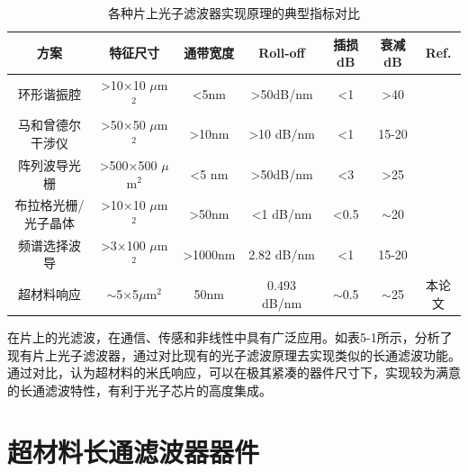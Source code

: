 \begin{table}[!htbp]
    \caption{各种片上光子滤波器实现原理的典型指标对比}
    \label{tab:5}
    \centering
    \footnotesize%
    \setlength{\tabcolsep}{4pt}%
    \renewcommand{\arraystretch}{1.2}%
\begin{tabular}{ccccccc}
方案         & 特征尺寸                      & 通带宽度                 & Roll-off               & 插损dB          & 衰减dB             & Ref.         \\ \hline
环形谐振腔      & \textgreater{}10×10 $\mu$m$^2$   & \textless 5nm        & \textgreater{}50dB/nm  & \textless 1   & \textgreater 40  & \cite{Optical2006,Bogaerts2015Silicon} \\
马和曾德尔干涉仪   & \textgreater{}50×50 $\mu$m$^2$   & \textgreater{}10nm   & \textgreater{}10 dB/nm & \textless{}1  & 15-20            &\cite{Chen2017Silicon}   \\
阵列波导光栅     & \textgreater{}500×500 $\mu$m$^2$ & \textless 5 nm       & \textgreater{}50dB/nm  & \textless{}3  & \textgreater{}25 & \cite{Daoxin2011Low}   \\
布拉格光栅/光子晶体 & \textgreater{}10×10 $\mu$m$^2$   & \textgreater{}50nm   & \textless{}1 dB/nm     & \textless 0.5 & $\sim$20         & \cite{Jiang2011Slab}    \\
频谱选择波导     & \textgreater{}3×100 $\mu$m$^2$   & \textgreater{}1000nm & 2.82 dB/nm             & \textless{}1  & 15-20            & \cite{Magden2018Transmissive}    \\
超材料响应      & $\sim$5×5$\mu$m$^2$              & 50nm                 & 0.493 dB/nm            & $\sim$0.5     & $\sim$25         & 本论文       
\end{tabular}
\end{table}

在片上的光滤波，在通信、传感和非线性中具有广泛应用。如表5-1所示，分析了现有片上光子滤波器，通过对比现有的光子滤波原理去实现类似的长通滤波功能。通过对比，认为超材料的米氏响应，可以在极其紧凑的器件尺寸下，实现较为满意的长通滤波特性，有利于光子芯片的高度集成。

\section{超材料长通滤波器器件}

